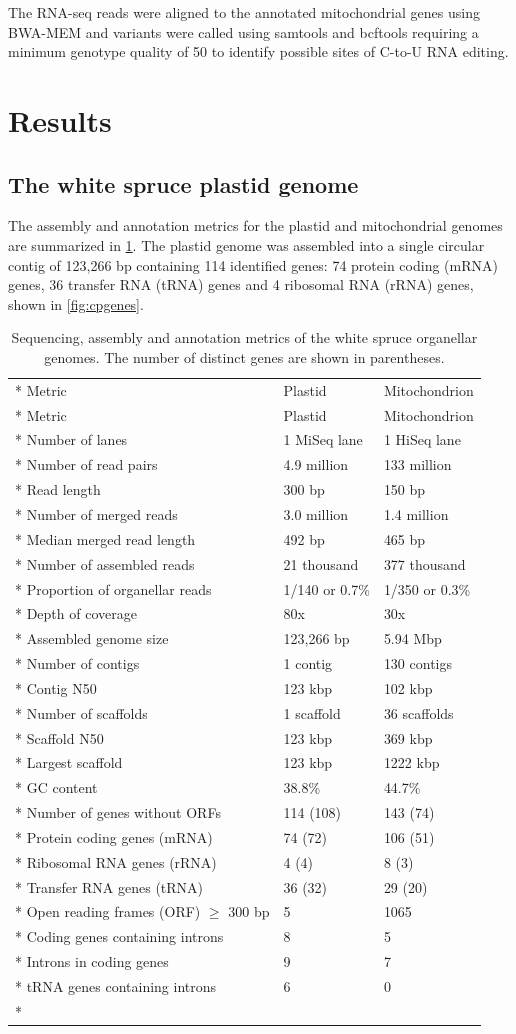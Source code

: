 \documentclass[
  12pt,
  oneside,
  openany]{book}
\begin{document}
The RNA-seq reads were aligned to the annotated mitochondrial genes using BWA-MEM and variants were called using samtools and bcftools requiring a minimum genotype quality of 50 to identify possible sites of C-to-U RNA editing.

\hypertarget{results-4}{%
\section{Results}\label{results-4}}

\hypertarget{the-white-spruce-plastid-genome}{%
\subsection{The white spruce plastid genome}\label{the-white-spruce-plastid-genome}}

The assembly and annotation metrics for the plastid and mitochondrial genomes are summarized in \cref{tbl:metrics}. The plastid genome was assembled into a single circular contig of 123,266 bp containing 114 identified genes: 74 protein coding (mRNA) genes, 36 transfer RNA (tRNA) genes and 4 ribosomal RNA (rRNA) genes, shown in \cref{fig:cpgenes}.

\hypertarget{tbl:metrics}{}
\begin{singlespace}
\small
\begin{longtable}[]{@{}lll@{}}
\caption[Sequencing, assembly and annotation metrics of the white spruce organellar genomes.]{\label{tbl:metrics}Sequencing, assembly and annotation metrics of the white spruce organellar genomes. The number of distinct genes are shown in parentheses.}\tabularnewline*
\toprule
Metric & Plastid & Mitochondrion\tabularnewline*
\midrule
\endfirsthead
\toprule
Metric & Plastid & Mitochondrion\tabularnewline*
\midrule
\endhead
Number of lanes & 1 MiSeq lane & 1 HiSeq lane\tabularnewline*
Number of read pairs & 4.9 million & 133 million\tabularnewline*
Read length & 300 bp & 150 bp\tabularnewline*
Number of merged reads & 3.0 million & 1.4 million\tabularnewline*
Median merged read length & 492 bp & 465 bp\tabularnewline*
Number of assembled reads & 21 thousand & 377 thousand\tabularnewline*
Proportion of organellar reads & 1/140 or 0.7\% & 1/350 or 0.3\%\tabularnewline*
Depth of coverage & 80x & 30x\tabularnewline*
Assembled genome size & 123,266 bp & 5.94 Mbp\tabularnewline*
Number of contigs & 1 contig & 130 contigs\tabularnewline*
Contig N50 & 123 kbp & 102 kbp\tabularnewline*
Number of scaffolds & 1 scaffold & 36 scaffolds\tabularnewline*
Scaffold N50 & 123 kbp & 369 kbp\tabularnewline*
Largest scaffold & 123 kbp & 1222 kbp\tabularnewline*
GC content & 38.8\% & 44.7\%\tabularnewline*
Number of genes without ORFs & 114 (108) & 143 (74)\tabularnewline*
Protein coding genes (mRNA) & 74 (72) & 106 (51)\tabularnewline*
Ribosomal RNA genes (rRNA) & 4 (4) & 8 (3)\tabularnewline*
Transfer RNA genes (tRNA) & 36 (32) & 29 (20)\tabularnewline*
Open reading frames (ORF) \(\geq\) 300 bp & 5 & 1065\tabularnewline*
Coding genes containing introns & 8 & 5\tabularnewline*
Introns in coding genes & 9 & 7\tabularnewline*
tRNA genes containing introns & 6 & 0\tabularnewline*
\bottomrule
\end{longtable}
\end{singlespace}
\end{document}
